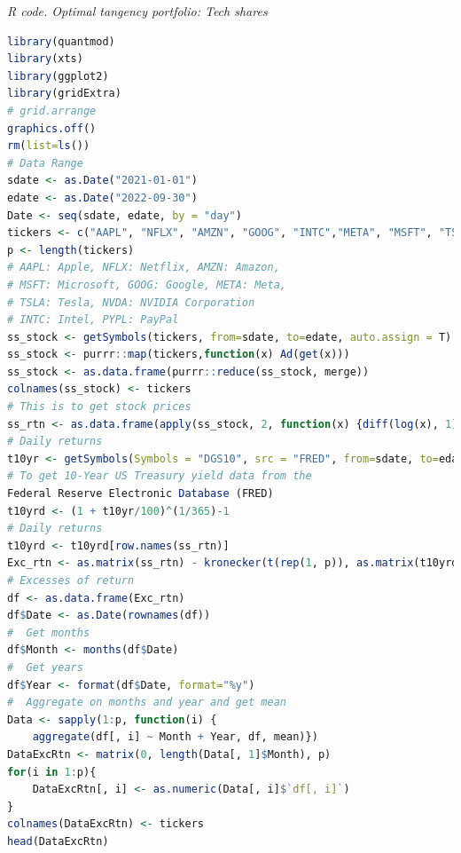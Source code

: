 \begin{enumerate}
\begin{tcolorbox}[enhanced,width=4.67in,center upper,
	fontupper=\large\bfseries,drop shadow southwest,sharp corners]
	\textit{R code. Optimal tangency portfolio: Tech shares}
\begin{VF}
\begin{lstlisting}[language=R]
library(quantmod)
library(xts)
library(ggplot2)
library(gridExtra) 
# grid.arrange
graphics.off()
rm(list=ls())
# Data Range
sdate <- as.Date("2021-01-01")
edate <- as.Date("2022-09-30")
Date <- seq(sdate, edate, by = "day")
tickers <- c("AAPL", "NFLX", "AMZN", "GOOG", "INTC","META", "MSFT", "TSLA", "NVDA", "PYPL")
p <- length(tickers)
# AAPL: Apple, NFLX: Netflix, AMZN: Amazon, 
# MSFT: Microsoft, GOOG: Google, META: Meta,
# TSLA: Tesla, NVDA: NVIDIA Corporation
# INTC: Intel, PYPL: PayPal 
ss_stock <- getSymbols(tickers, from=sdate, to=edate, auto.assign = T)
ss_stock <- purrr::map(tickers,function(x) Ad(get(x)))
ss_stock <- as.data.frame(purrr::reduce(ss_stock, merge))
colnames(ss_stock) <- tickers
# This is to get stock prices
ss_rtn <- as.data.frame(apply(ss_stock, 2, function(x) {diff(log(x), 1)}))
# Daily returns
t10yr <- getSymbols(Symbols = "DGS10", src = "FRED", from=sdate, to=edate, auto.assign = F)
# To get 10-Year US Treasury yield data from the 
Federal Reserve Electronic Database (FRED)
t10yrd <- (1 + t10yr/100)^(1/365)-1 
# Daily returns
t10yrd <- t10yrd[row.names(ss_rtn)]
Exc_rtn <- as.matrix(ss_rtn) - kronecker(t(rep(1, p)), as.matrix(t10yrd))
# Excesses of return
df <- as.data.frame(Exc_rtn)
df$Date <- as.Date(rownames(df))
#  Get months
df$Month <- months(df$Date)
#  Get years
df$Year <- format(df$Date, format="%y")
#  Aggregate on months and year and get mean
Data <- sapply(1:p, function(i) {
	aggregate(df[, i] ~ Month + Year, df, mean)})
DataExcRtn <- matrix(0, length(Data[, 1]$Month), p)
for(i in 1:p){
	DataExcRtn[, i] <- as.numeric(Data[, i]$`df[, i]`)
}
colnames(DataExcRtn) <- tickers
head(DataExcRtn)
\end{lstlisting}
\end{VF}
\end{tcolorbox}
     

\end{enumerate}
